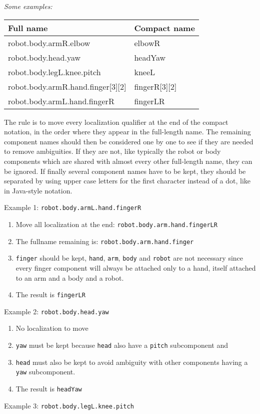 \documentclass[a4paper]{article}
\begin{document}
{\sffamily\itshape
Some examples:}

\begin{flushleft}
\tablehead{}
\begin{supertabular}{|m{9.008cm}|m{5.533cm}|}
\hline
\sffamily Full name &
\sffamily Compact name\\\hline
\ttfamily robot.body.armR.elbow &
\ttfamily elbowR\\\hline
\ttfamily robot.body.head.yaw &
\ttfamily headYaw\\\hline
\ttfamily robot.body.legL.knee.pitch &
\ttfamily kneeL\\\hline
\ttfamily robot.body.armR.hand.finger[3][2] &
\ttfamily fingerR[3][2]\\\hline
\ttfamily robot.body.armL.hand.fingerR &
\ttfamily fingerLR\\\hline
\end{supertabular}
\end{flushleft}
{\sffamily
The rule is to move every localization qualifier at the end of the
compact notation, in the order where they appear in the full-length
name. The remaining component names should then be considered one by
one to see if they are needed to remove ambiguities. If they are not,
like typically the robot or body components which are shared with
almost every other full-length name, they can be ignored. If finally
several component names have to be kept, they should be separated by
using upper case letters for the first character instead of a dot, like
in Java-style notation.}

{\sffamily
Example 1: \texttt{robot.body.armL.hand.fingerR}}


\begin{enumerate}
\item {\sffamily
Move all localization at the end: \texttt{robot.body.arm.hand.fingerLR}}
\item {\sffamily
The fullname remaining is: \texttt{robot.body.arm.hand.finger}}
\item {\sffamily
\texttt{finger} should be kept, \texttt{hand}, \texttt{arm},
\texttt{body} and \texttt{robot} are not necessary since every finger
component will always be attached only to a hand, itself attached to an
arm and a body and a robot.}
\item {\sffamily
The result is \texttt{fingerLR}}
\end{enumerate}
{\sffamily
Example 2: \texttt{robot.body.head.yaw}}


\begin{enumerate}
\item {\sffamily
No localization to move}
\item {\sffamily
\texttt{yaw} must be kept because \texttt{head} also have a
\texttt{pitch} subcomponent and }
\item {\sffamily
\texttt{head} must also be kept to avoid ambiguity with other components
having a \texttt{yaw} subcomponent.}
\item {\sffamily
The result is \texttt{headYaw}}
\end{enumerate}
{\sffamily
Example 3: \texttt{robot.body.legL.knee.pitch}}
\end{document}
